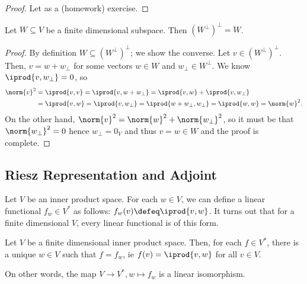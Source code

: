 \begin{proof}
    Let as a (homework) exercise.
\end{proof}

\begin{corollary}
    Let $W \subseteq V$ be a finite dimensional subspace. Then $(W^\perp)^\perp = W$.
\end{corollary}

\begin{proof}
    By definition $W \subseteq (W^\perp)^\perp$; we show the converse. Let $v \in (W^\perp)^\perp$. Then, $v= w + w_\perp$ for some vectors $w \in W$ and $w_\perp \in W^\perp$. We know $\iprod{v, w_\perp} = 0$, so \begin{align*}
    \norm{v}^2 &= \iprod{v, v}     = \iprod{v, w + w_\perp} = \iprod{v, w} + \iprod{v, w_\perp} \\
    &= \iprod{v, w} = \iprod{v, w_\perp} = \iprod{w + w_\perp, w_\perp} = \iprod{w, w} = \norm{w}^2.
    \end{align*}
    On the other hand, $\norm{v}^2 = \norm{w}^2 + \norm{w_\perp}^2$, so it must be that $\norm{w_\perp}^2 = 0$ hence $w_\perp = 0_V$ and thus $v = w \in W$ and the proof is complete.
\end{proof}

\subsection{Riesz Representation and Adjoint}

Let $V$ be an inner product space. For each $w \in V$, we can define a linear functional $f_w \in V^\ast$ as follows: $f_w(v) \defeq \iprod{v, w}$. It turns out that for a finite dimensional $V$, every linear functional is of this form.

\begin{theorem}
    Let $V$ be a finite dimensional inner product space. Then, for each $f \in V^\ast$, there is a unique $w \in V$ such that $f = f_w$, ie $f(v) = \iprod{v, w}$ for all $v \in V$. 

    On other words, the map $V \to V^\ast, w \mapsto f_w$ is a linear isomorphism.
\end{theorem}


